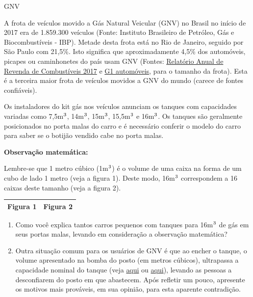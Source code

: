 \practice{}
\label{\detokenize{GE504-4::doc}}\label{\detokenize{GE504-4:praticando}}
\begin{task}{GNV}



A frota de veículos movido a Gás Natural Veicular (GNV) no Brasil no início de 2017 era de 1.859.300 veículos (Fonte: Instituto Brasileiro de Petróleo, Gás e Biocombustíveis - IBP). Metade desta frota está no Rio de Janeiro, seguido por São Paulo com 21,5\%. Isto significa que aproximadamente 4,5\% dos automóveis, picapes ou caminhonetes do país usam GNV (Fontes: \href{http://www.fecombustiveis.org.br/relatorios/relatorio-anual-da-revenda-de-combustiveis-2017/}{Relatório Anual de Revenda de Combustíveis 2017} e \href{https://g1.globo.com/carros/noticia/frota-brasileira-de-veiculos-cresce-12-em-2017-diz-sindipecas.ghtml}{G1 automóveis}, para o tamanho da frota). Esta é a terceira maior frota de veículos movidos a GNV do mundo (carece de fontes confiáveis).

Os instaladores do kit gás nos veículos anunciam os tanques com capacidades variadas como 7,5m\(\sp{\text{3}}\), 14m\(\sp{\text{3}}\), 15m\(\sp{\text{3}}\), 15,5m\(\sp{\text{3}}\) e 16m\(\sp{\text{3}}\). Os tanques são geralmente posicionados no porta malas do carro e é necessário conferir o modelo do carro para saber se o botijão vendido cabe no porta malas.

\textbf{Observação matemática:}

Lembre-se que 1 metro cúbico (1m\(\sp{\text{3}}\)) é o volume de uma caixa na forma de um cubo de lado 1 metro (veja  a figura 1). Deste modo, 16m\(\sp{\text{3}}\) correspondem a 16 caixas deste tamanho (veja a figura 2).

\begin{table}[H]
\centering
\begin{tabu} to \textwidth{|c|c|}
\hline
Figura 1 & Figura 2\\
\hline
\end{tabu}
\end{table}

\begin{enumerate}
\item {} 
Como você explica tantos carros pequenos com tanques para 16m\(\sp{\text{3}}\) de gás em seus portas malas, levando em consideração a observação matemática?

\item {} 
Outra situação comum para os usuários de GNV é que ao encher o tanque, o volume apresentado na bomba do posto (em metros cúbicos), ultrapassa a capacidade nominal do tanque (veja \href{https://br.answers.yahoo.com/question/index?qid=20120927220946AAlMbWD}{aqui} ou \href{https://br.answers.yahoo.com/question/index?qid=20061006192226AAvKvOl}{aqui}), levando as pessoas a desconfiarem do posto em que abastecem. Após refletir um pouco, apresente os motivos mais prováveis, em sua opinião, para esta aparente contradição.


\end{enumerate}
\end{task}

